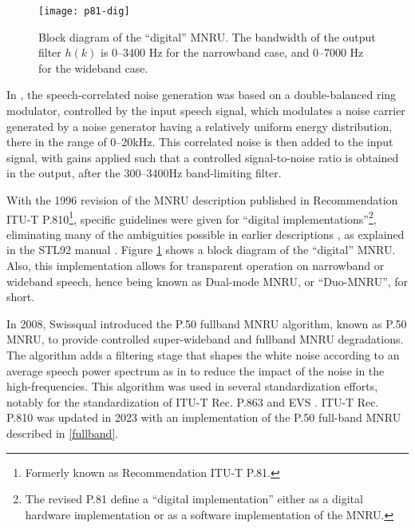  \begin{figure}[hpbt]
  \begin{center}
    \texttt{[image: p81-dig]}
  \end{center}
  \caption{Block diagram of the ``digital'' MNRU. The bandwidth of the output filter $h(k)$ is 0--3400 Hz for the
  narrowband case, and 0--7000 Hz for the wideband case. \label{1/P.810}}
 \end{figure}

In \cite{Q001.02.04.02}, the speech-correlated noise generation was based on a double-balanced ring modulator,
controlled by the input speech signal, which modulates a noise carrier generated by a noise generator having a
relatively uniform energy distribution, there in the range of 0--20kHz.
This correlated noise is then added to the input signal, with gains applied such that a controlled signal-to-noise
ratio is obtained in the output, after the 300--3400Hz band-limiting filter.

With the 1996 revision of the MNRU description published in Recommendation ITU-T P.810\footnote{\SF Formerly known as
Recommendation ITU-T P.81.}, specific
guidelines were given for ``digital implementations''\footnote{\SF The revised
P.81 define a ``digital implementation'' either as a digital hardware implementation or as a software implementation of
the MNRU.}, eliminating many of the ambiguities
possible in earlier descriptions \cite{Old-P.81}, as explained in the STL92 manual
\cite[Chapter 8]{STL92-Manual}. Figure \ref{1/P.810} shows a block diagram of the ``digital'' MNRU.
Also, this implementation allows for transparent operation on narrowband or wideband speech, hence being known as
Dual-mode MNRU, or ``Duo-MNRU'', for short.

In 2008, Swissqual introduced the P.50 fullband MNRU algorithm, known as P.50 MNRU, to provide controlled super-wideband and
fullband MNRU degradations.
The algorithm adds a filtering stage that shapes the white noise according to an average speech power spectrum as
in \cite{P.50} to reduce the impact of the noise in the high-frequencies.
This algorithm was used in several standardization efforts, notably for the standardization of ITU-T Rec. P.863 \cite{P.863}
and EVS \cite{EVS}.
ITU-T Rec. P.810 was updated in 2023 with an implementation of the P.50 full-band MNRU described in \ref{fullband}.

